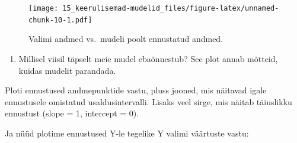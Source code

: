 \documentclass[]{book}
\providecommand{\tightlist}{%
  \setlength{\itemsep}{0pt}\setlength{\parskip}{0pt}}
\begin{document}
\begin{figure}
\centering
\texttt{[image: 15\_keerulisemad-mudelid\_files/figure-latex/unnamed-chunk-10-1.pdf]}
\caption{\label{fig:unnamed-chunk-10}Valimi andmed vs.~mudeli poolt ennustatud andmed.}
\end{figure}

\begin{enumerate}
\def\labelenumi{\arabic{enumi})}
\setcounter{enumi}{1}
\tightlist
\item
  Millisel viisil täpselt meie mudel ebaõnnestub? See plot annab mõtteid, kuidas mudelit parandada.
\end{enumerate}

Ploti ennustused andmepunktide vastu, pluss jooned, mis näitavad igale ennustusele omistatud usaldusintervalli. Lisaks veel sirge, mis näitab täiuslikku ennustust (slope = 1, intercept = 0).

Ja nüüd plotime ennustused Y-le tegelike Y valimi väärtuste vastu:
\end{document}
